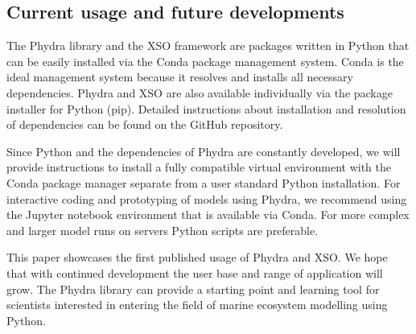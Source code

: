 \documentclass[journal abbreviation, manuscript]{copernicus}
\begin{document}

\subsection{Current usage and future developments}
The Phydra library and the XSO framework are packages written in Python that can be easily installed via the Conda package management system. Conda is the ideal management system because it resolves and installs all necessary dependencies. Phydra and XSO are also available individually via the package installer for Python (pip). Detailed instructions about installation and resolution of dependencies can be found on the GitHub repository.

Since Python and the dependencies of Phydra are constantly developed, we will provide instructions to install a fully compatible virtual environment with the Conda package manager separate from a user standard Python installation. For interactive coding and prototyping of models using Phydra, we recommend using the Jupyter notebook environment that is available via Conda. For more complex and larger model runs on servers Python scripts are preferable.

This paper showcases the first published usage of Phydra and XSO. We hope that with continued development the user base and range of application will grow. The Phydra library can provide a starting point and learning tool for scientists interested in entering the field of marine ecosystem modelling using Python.
\end{document}
